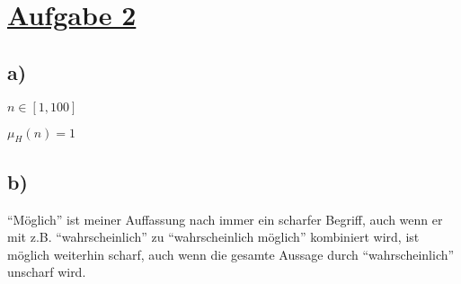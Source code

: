 \section*{\underline{Aufgabe 2}}

\subsection*{a)}

$n \in [1,100]$

$\mu_H(n)=1$


\subsection*{b)}

``Möglich'' ist meiner Auffassung nach immer ein scharfer Begriff,
auch wenn er mit z.B. ``wahrscheinlich'' zu ``wahrscheinlich möglich'' kombiniert wird,
ist möglich weiterhin scharf, auch wenn die gesamte Aussage durch ``wahrscheinlich'' unscharf wird.